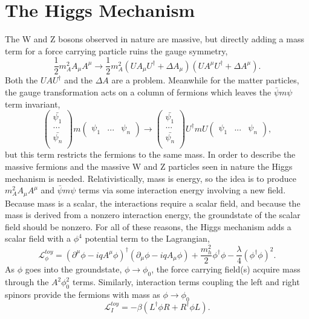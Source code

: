 \section{The Higgs Mechanism}
The W and Z bosons observed in nature are massive, but directly adding a mass term for a force carrying particle ruins the gauge symmetry, 
\begin{equation}
\frac{1}{2}m_A^2A_\mu A^\mu \rightarrow \frac{1}{2}m_A^2(UA_\mu U^\dagger + \Delta A_\mu)(UA^\mu U^\dagger + \Delta A^\mu). 
\end{equation}
Both the  $UAU^\dagger$ and the $\Delta A$ are a problem. Meanwhile for the matter particles, the gauge transformation acts on a column of fermions which leaves the $\bar{\psi}m\psi$ term invariant,  
\begin{equation}
\begin{pmatrix}
\bar{\psi_1} \\
...          \\
\bar{\psi_n} \\
\end{pmatrix}
m
\begin{pmatrix}
\psi_1 & ... & \psi_n
\end{pmatrix}
\rightarrow
\begin{pmatrix}
\bar{\psi_1} \\
...          \\
\bar{\psi_n} \\
\end{pmatrix}
U^\dagger mU
\begin{pmatrix}
\psi_1 & ... & \psi_n
\end{pmatrix},
\end{equation}
but this term restricts the fermions to the same mass. In order to describe the massive fermions and the massive W and Z particles seen in nature the Higgs mechanism is needed. Relativistically, mass is energy, so the idea is to produce $m_A^2A_\mu A^\mu$ and $\bar{\psi}m\psi$ terms via some interaction energy involving a new field. Because mass is a scalar, the interactions require a scalar field, and because the mass is derived from a nonzero interaction energy, the groundstate of the scalar field should be nonzero. For all of these reasons, the Higgs mechanism adds a scalar field with a $\phi^4$ potential term to the Lagrangian, 
\begin{equation}
\label{eq:toyew1}
\mathcal{L}^{toy}_\phi = (\partial^\mu\phi - iqA^\mu\phi)^\dagger(\partial_\mu\phi - iqA_\mu\phi) + \frac{m_h^2}{2}\phi^\dagger\phi - \frac{\lambda}{4}(\phi^\dagger\phi)^2.
\end{equation}
As $\phi$ goes into the groundstate, $\phi \rightarrow \phi_0$, the force carrying field(s) acquire mass through the $A^2\phi_0^2$ terms. Similarly, interaction terms coupling the left and right spinors provide the fermions with mass as $\phi \rightarrow \phi_0$
\begin{equation}
\label{eq:toyew2}
\mathcal{L}^{toy}_I = -\beta(L^\dagger\phi R + R^\dagger\phi L).
\end{equation}

